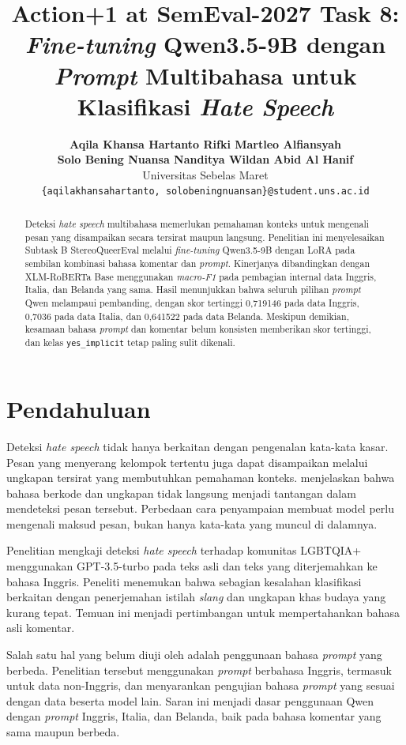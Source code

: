 \documentclass[11pt]{article}
\title{Action+1 at SemEval-2027 Task 8: \textit{Fine-tuning} Qwen3.5-9B dengan \textit{Prompt} Multibahasa untuk Klasifikasi \textit{Hate Speech}}
\author{\textbf{Aqila Khansa Hartanto \quad Rifki Martleo Alfiansyah} \\
\textbf{Solo Bening Nuansa Nanditya \quad Wildan Abid Al Hanif} \\
Universitas Sebelas Maret \\
\texttt{\{aqilakhansahartanto, solobeningnuansan\}@student.uns.ac.id}}
\renewcommand{\abstractname}{Abstrak}
\begin{document}
\renewcommand{\abstractname}{Abstrak}
\pagestyle{plain}
\raggedbottom
\maketitle
\begin{abstract}
Deteksi \textit{hate speech} multibahasa memerlukan pemahaman konteks untuk mengenali pesan yang disampaikan secara tersirat maupun langsung. Penelitian ini menyelesaikan Subtask B StereoQueerEval melalui \textit{fine-tuning} Qwen3.5-9B dengan LoRA pada sembilan kombinasi bahasa komentar dan \textit{prompt}. Kinerjanya dibandingkan dengan XLM-RoBERTa Base menggunakan \textit{macro-F1} pada pembagian internal data Inggris, Italia, dan Belanda yang sama. Hasil menunjukkan bahwa seluruh pilihan \textit{prompt} Qwen melampaui pembanding, dengan skor tertinggi 0,719146 pada data Inggris, 0,7036 pada data Italia, dan 0,641522 pada data Belanda. Meskipun demikian, kesamaan bahasa \textit{prompt} dan komentar belum konsisten memberikan skor tertinggi, dan kelas \texttt{yes\_implicit} tetap paling sulit dikenali.
\end{abstract}

\section{Pendahuluan}
\label{sec:pendahuluan}

Deteksi \textit{hate speech} tidak hanya berkaitan dengan pengenalan kata-kata kasar. Pesan yang menyerang kelompok tertentu juga dapat disampaikan melalui ungkapan tersirat yang membutuhkan pemahaman konteks. \citet{elsherief-etal-2021-latent} menjelaskan bahwa bahasa berkode dan ungkapan tidak langsung menjadi tantangan dalam mendeteksi pesan tersebut. Perbedaan cara penyampaian membuat model perlu mengenali maksud pesan, bukan hanya kata-kata yang muncul di dalamnya.

Penelitian \citet{chan-etal-2024-hate} mengkaji deteksi \textit{hate speech} terhadap komunitas LGBTQIA+ menggunakan GPT-3.5-turbo pada teks asli dan teks yang diterjemahkan ke bahasa Inggris. Peneliti menemukan bahwa sebagian kesalahan klasifikasi berkaitan dengan penerjemahan istilah \textit{slang} dan ungkapan khas budaya yang kurang tepat. Temuan ini menjadi pertimbangan untuk mempertahankan bahasa asli komentar.

Salah satu hal yang belum diuji oleh \citet{chan-etal-2024-hate} adalah penggunaan bahasa \textit{prompt} yang berbeda. Penelitian tersebut menggunakan \textit{prompt} berbahasa Inggris, termasuk untuk data non-Inggris, dan menyarankan pengujian bahasa \textit{prompt} yang sesuai dengan data beserta model lain. Saran ini menjadi dasar penggunaan Qwen dengan \textit{prompt} Inggris, Italia, dan Belanda, baik pada bahasa komentar yang sama maupun berbeda.
\end{document}
